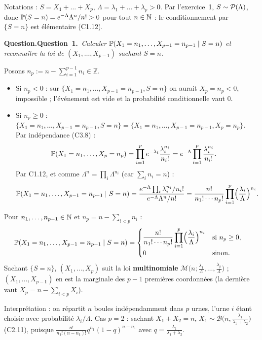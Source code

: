 \documentclass[11pt,a4paper]{article}
\newcommand{\question}[2]{\par\medskip\noindent\textbf{\ifx\relax#1\relax Question.\else Question~#1.\fi}~\textit{#2}\par\smallskip}
\providecommand{\Z}{\mathbb{Z}}
\newcommand{\Mult}{\mathcal{M}}
\newcommand{\Bin}{\mathcal{B}}
\begin{document}
\begin{exo}
Notations : $S=X_1+\dots+X_p$, $\Lambda=\lambda_1+\dots+\lambda_p>0$. Par l'exercice~1, $S\sim\mathcal{P}(\Lambda)$, donc
$\mathbb{P}(S=n)=e^{-\Lambda}\Lambda^n/n!>0$ pour tout $n\in\mathbb{N}$ : le conditionnement par $\{S=n\}$ est élémentaire (C1.12).

\question{1}{Calculer $\mathbb{P}(X_1=n_1,\dots,X_{p-1}=n_{p-1}\mid S=n)$ et reconnaître la loi de $(X_1,\dots,X_{p-1})$ sachant $S=n$.}

Posons $n_p:=n-\sum_{i=1}^{p-1}n_i\in\Z$.
\begin{itemize}
  \item Si $n_p<0$ : sur $\{X_1=n_1,\dots,X_{p-1}=n_{p-1},S=n\}$ on aurait $X_p=n_p<0$, impossible ; l'événement est vide et la probabilité
  conditionnelle vaut $0$.
  \item Si $n_p\ge0$ : $\{X_1=n_1,\dots,X_{p-1}=n_{p-1},S=n\}=\{X_1=n_1,\dots,X_{p-1}=n_{p-1},X_p=n_p\}$. Par indépendance (C3.8) :
  \[\mathbb{P}(X_1=n_1,\dots,X_p=n_p)=\prod_{i=1}^pe^{-\lambda_i}\frac{\lambda_i^{n_i}}{n_i!}=e^{-\Lambda}\prod_{i=1}^p\frac{\lambda_i^{n_i}}{n_i!}.\]
  Par C1.12, et comme $\Lambda^n=\prod_i\Lambda^{n_i}$ (car $\sum_in_i=n$) :
  \[\mathbb{P}(X_1=n_1,\dots,X_{p-1}=n_{p-1}\mid S=n)=\frac{e^{-\Lambda}\prod_i\lambda_i^{n_i}/n_i!}{e^{-\Lambda}\Lambda^n/n!}
  =\frac{n!}{n_1!\cdots n_p!}\prod_{i=1}^p\Bigl(\frac{\lambda_i}{\Lambda}\Bigr)^{n_i}.\]
\end{itemize}

\begin{resultat}
Pour $n_1,\dots,n_{p-1}\in\mathbb{N}$ et $n_p=n-\sum_{i<p}n_i$ :
\[\mathbb{P}(X_1=n_1,\dots,X_{p-1}=n_{p-1}\mid S=n)=\begin{cases}\dfrac{n!}{n_1!\cdots n_p!}\displaystyle\prod_{i=1}^p\Bigl(\frac{\lambda_i}{\Lambda}\Bigr)^{n_i}&\text{si }n_p\ge0,\\[2mm]
0&\text{sinon.}\end{cases}\]
Sachant $\{S=n\}$, $(X_1,\dots,X_p)$ suit la loi \textbf{multinomiale} $\Mult\bigl(n;\frac{\lambda_1}\Lambda,\dots,\frac{\lambda_p}\Lambda\bigr)$ ;
$(X_1,\dots,X_{p-1})$ en est la marginale des $p-1$ premières coordonnées (la dernière vaut $X_p=n-\sum_{i<p}X_i$).
\end{resultat}

Interprétation : on répartit $n$ boules indépendamment dans $p$ urnes, l'urne $i$ étant choisie avec probabilité $\lambda_i/\Lambda$.
Cas $p=2$ : sachant $X_1+X_2=n$, $X_1\sim\Bin\bigl(n,\frac{\lambda_1}{\lambda_1+\lambda_2}\bigr)$ (C2.11), puisque
$\frac{n!}{n_1!(n-n_1)!}q^{n_1}(1-q)^{n-n_1}$ avec $q=\frac{\lambda_1}{\lambda_1+\lambda_2}$.


\end{exo}
\end{document}
